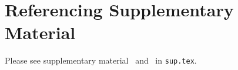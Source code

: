 \section{Referencing Supplementary Material}

Please see supplementary material~ and~ in \texttt{sup.tex}.
